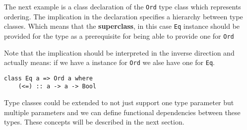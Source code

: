 The next example is a class declaration of the \texttt{Ord} type class which
represents ordering. The implication in the declaration specifies a hierarchy
between type classes. Which means that the \textbf{superclass}, in this case
\texttt{Eq} instance should be provided for the type as a prerequisite for being
able to provide one for \texttt{Ord}

Note that the implication should be interpreted in the inverse direction and
actually means: if we have a instance for \texttt{Ord} we alse have one for
\texttt{Eq}.
\begin{verbatim}
class Eq a => Ord a where
    (<=) :: a -> a -> Bool
\end{verbatim}

Type classes could be extended to not just support one type parameter but
multiple parameters and we can define functional dependencies between these
types. These concepts will be described in the next section.
